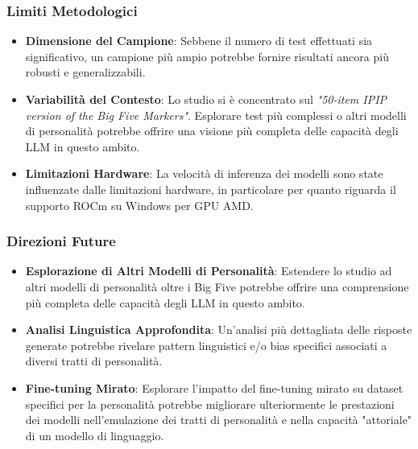 \subsubsection{Limiti Metodologici}
\begin{itemize}
    \item \textbf{Dimensione del Campione}: Sebbene il numero di test effettuati sia significativo, un campione più ampio potrebbe fornire risultati ancora più robusti e generalizzabili.
    
    \item \textbf{Variabilità del Contesto}: Lo studio si è concentrato sul \textit{"50-item IPIP version of the Big Five Markers"}.
    Esplorare test più complessi o altri modelli di personalità potrebbe offrire una visione più completa delle capacità degli LLM in questo ambito.
    
    \item \textbf{Limitazioni Hardware}: La velocità di inferenza dei modelli sono state influenzate dalle limitazioni hardware, in particolare per quanto riguarda il supporto ROCm su Windows per GPU AMD.
\end{itemize}

\subsubsection{Direzioni Future}
\begin{itemize}
    \item \textbf{Esplorazione di Altri Modelli di Personalità}: Estendere lo studio ad altri modelli di personalità oltre i Big Five potrebbe offrire una comprensione più completa delle capacità degli LLM in questo ambito.
    
    \item \textbf{Analisi Linguistica Approfondita}: Un'analisi più dettagliata delle risposte generate potrebbe rivelare pattern linguistici e/o bias specifici associati a diversi tratti di personalità.
    
    \item \textbf{Fine-tuning Mirato}: Esplorare l'impatto del fine-tuning mirato su dataset specifici per la personalità potrebbe migliorare ulteriormente le prestazioni dei modelli nell'emulazione dei tratti di personalità e nella capacità "attoriale" di un modello di linguaggio.
\end{itemize}
